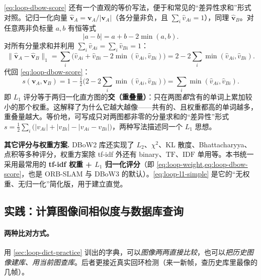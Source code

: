 \begin{derivation}
\cref{eq:loop-dbow-score} 还有一个直观的等价写法，便于和常见的“差异性求和”形式对照\cite{gaoxiang2019slam14}。记归一化向量 $\widehat{\boldsymbol v}_A=\boldsymbol v_A/\lvert\boldsymbol v_A\rvert$（各分量非负，且 $\sum_i\widehat v_{Ai}=1$），同理 $\widehat{\boldsymbol v}_B$。对任意两非负标量 $a,b$ 有恒等式
\[
  \lvert a-b\rvert = a+b-2\min(a,b).
\]
对所有分量求和并利用 $\sum_i\widehat v_{Ai}=\sum_i\widehat v_{Bi}=1$：
\[
  \lVert\widehat{\boldsymbol v}_A-\widehat{\boldsymbol v}_B\rVert_1
  =\sum_i\big(\widehat v_{Ai}+\widehat v_{Bi}-2\min(\widehat v_{Ai},\widehat v_{Bi})\big)
  =2-2\sum_i\min(\widehat v_{Ai},\widehat v_{Bi}).
\]
代回 \cref{eq:loop-dbow-score}：
\[
  s(\boldsymbol v_A,\boldsymbol v_B)=1-\tfrac12\Big(2-2\textstyle\sum_i\min(\widehat v_{Ai},\widehat v_{Bi})\Big)
  =\sum_i\min(\widehat v_{Ai},\widehat v_{Bi}).
\]
即 $L_1$ 评分等于两归一化直方图的\textbf{交（重叠量）}：只在两图\emph{都}含有的单词上累加较小的那个权重。这解释了为什么它越大越像——共有的、且权重都高的单词越多，重叠量越大。等价地，可写成只对两图都非零的分量求和的“差异性”形式 $s=\tfrac12\sum_i\big(\lvert v_{Ai}\rvert+\lvert v_{Bi}\rvert-\lvert v_{Ai}-v_{Bi}\rvert\big)$，两种写法描述同一个 $L_1$ 思想。
\end{derivation}

\begin{note}
\textbf{其它评分与权重方案.}\;
DBoW2 库还实现了 $L_2$、$\chi^2$、KL 散度、Bhattacharyya、点积等多种评分，权重方案除 tf-idf 外还有 binary、$\mathrm{TF}$、$\mathrm{IDF}$ 单用等\cite{galvez2012bags}。本书统一采用最常用的 \textbf{tf-idf 权重 + $L_1$ 归一化评分}（即 \cref{eq:loop-weight,eq:loop-dbow-score}，也是 ORB-SLAM\cite{murartal2015orbslam} 与 DBoW3 的默认）。\cref{eq:loop-l1-simple} 是它的“无权重、无归一化”简化版，用于建立直觉。
\end{note}

\subsection{实践：计算图像间相似度与数据库查询}
\label{sec:loop-score-practice}

\paragraph{两种比对方式。}
用 \cref{sec:loop-dict-practice} 训出的字典，可以\emph{图像两两直接比较}，也可以\emph{把历史图像建库、用当前图查库}\cite{gaoxiang2019slam14}。后者更接近真实回环检测（来一新帧，查历史库里最像的几帧）。


